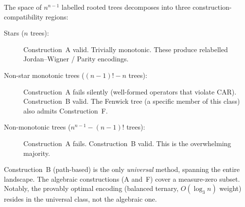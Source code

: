 The space of $n^{n-1}$ labelled rooted trees decomposes into three
construction-compatibility regions:

\begin{description}
  \item[Stars ($n$ trees):] Construction~A valid.  Trivially monotonic.
    These produce relabelled Jordan--Wigner / Parity encodings.

  \item[Non-star monotonic trees ($(n{-}1)! - n$ trees):]
    Construction~A fails silently (well-formed operators that violate
    CAR).  Construction~B valid.  The Fenwick tree (a specific member
    of this class) also admits Construction~F.

  \item[Non-monotonic trees ($n^{n-1} - (n{-}1)!$ trees):]
    Construction~A fails.  Construction~B valid.  This is the
    overwhelming majority.
\end{description}

Construction~B (path-based) is the only \emph{universal} method,
spanning the entire landscape.  The algebraic constructions (A and~F)
cover a measure-zero subset.  Notably, the provably optimal encoding
(balanced ternary, $O(\log_3 n)$ weight) resides in the universal
class, not the algebraic one.
